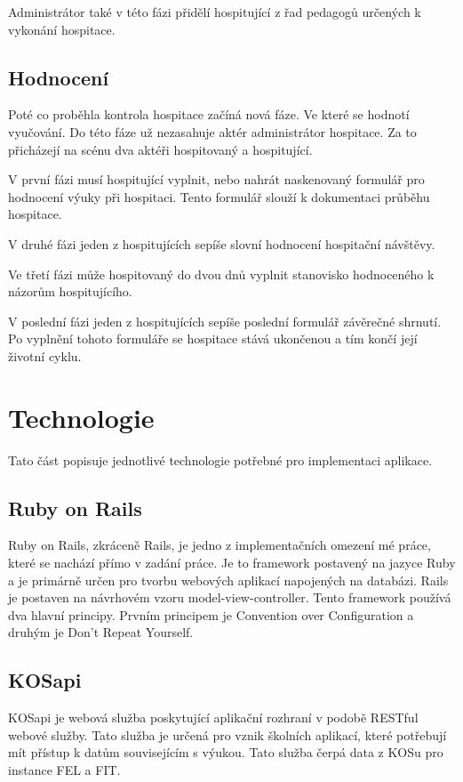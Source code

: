 Administrátor také v této fázi přidělí hospitující z řad pedagogů určených k vykonání hospitace.  
 
\subsection{Hodnocení}
Poté co proběhla kontrola hospitace začíná nová fáze. Ve které se hodnotí vyučování. Do této fáze už nezasahuje aktér administrátor hospitace. Za to přicházejí na scénu dva aktéři hospitovaný a hospitující.

V první fázi musí hospitující vyplnit, nebo nahrát naskenovaný formulář pro hodnocení výuky při hospitaci. Tento formulář slouží k dokumentaci průběhu hospitace.

V druhé fázi jeden z hospitujících sepíše slovní hodnocení hospitační návštěvy.

Ve třetí fázi může hospitovaný do dvou dnů vyplnit stanovisko hodnoceného k názorům hospitujícího.  

V poslední fázi jeden z hospitujících sepíše poslední formulář závěrečné shrnutí. Po vyplnění tohoto formuláře se hospitace stává ukončenou a tím končí její životní cyklu.
 
\section{Technologie}
Tato část popisuje jednotlivé technologie potřebné pro implementaci aplikace.

\subsection{Ruby on Rails}
Ruby on Rails, zkráceně Rails, je jedno z implementačních omezení mé práce, které se nachází přímo v zadání práce. Je to framework postavený na jazyce Ruby a je primárně určen pro tvorbu webových aplikací napojených na databázi. Rails je postaven na návrhovém vzoru model-view-controller. Tento framework používá dva hlavní principy. Prvním principem je Convention over Configuration a druhým je Don’t Repeat Yourself.

\subsection{KOSapi}
KOSapi je webová služba poskytující aplikační rozhraní v podobě RESTful webové služby. Tato služba je určená pro vznik školních aplikací, které potřebují mít přístup k datům souvisejícím s výukou. Tato služba čerpá data z KOSu pro instance FEL a FIT.

